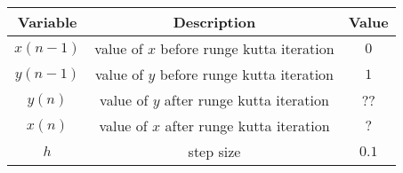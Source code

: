 \begin{tabular}[12.1pt]{ |c| c| c|}
    \hline
    \textbf{Variable} & \textbf{Description} &\textbf{Value}\\ 
    \hline
    $x(n-1)$ & value of $x$ before runge kutta iteration & $0$ \\
    \hline 
    $y(n-1)$ & value of $y$ before runge kutta iteration  &$1$ \\
    \hline 
    $y(n)$ & value of $y$ after runge kutta iteration & $?$?\\
    \hline
   $x(n)$ & value of $x$ after runge kutta iteration  & $?$\\
   \hline

   $h$ & step size & $0.1$\\
   \hline
    \end{tabular}
